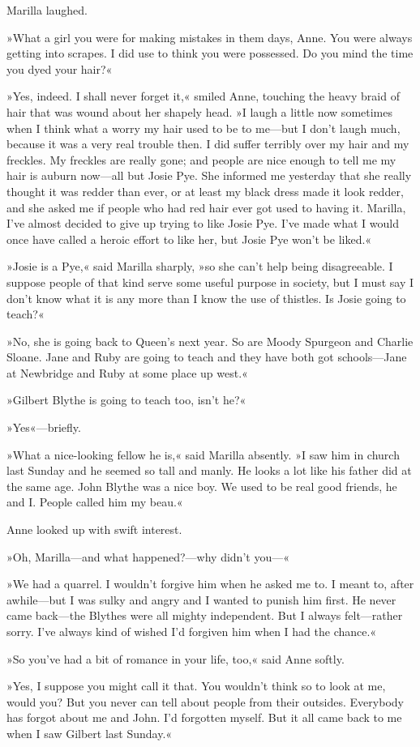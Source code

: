 Marilla laughed.

»What a girl you were for making mistakes in them days, Anne. You were always getting into scrapes. I did use to think you were possessed. Do you mind the time you dyed your hair?«

»Yes, indeed. I shall never forget it,« smiled Anne, touching the heavy braid of hair that was wound about her shapely head. »I laugh a little now sometimes when I think what a worry my hair used to be to me—but I don’t laugh much, because it was a very real trouble then. I did suffer terribly over my hair and my freckles. My freckles are really gone; and people are nice enough to tell me my hair is auburn now—all but Josie Pye. She informed me yesterday that she really thought it was redder than ever, or at least my black dress made it look redder, and she asked me if people who had red hair ever got used to having it. Marilla, I’ve almost decided to give up trying to like Josie Pye. I’ve made what I would once have called a heroic effort to like her, but Josie Pye won’t be liked.«

»Josie is a Pye,« said Marilla sharply, »so she can’t help being disagreeable. I suppose people of that kind serve some useful purpose in society, but I must say I don’t know what it is any more than I know the use of thistles. Is Josie going to teach?«

»No, she is going back to Queen’s next year. So are Moody Spurgeon and Charlie Sloane. Jane and Ruby are going to teach and they have both got schools—Jane at Newbridge and Ruby at some place up west.«

»Gilbert Blythe is going to teach too, isn’t he?«

»Yes«—briefly.

»What a nice-looking fellow he is,« said Marilla absently. »I saw him in church last Sunday and he seemed so tall and manly. He looks a lot like his father did at the same age. John Blythe was a nice boy. We used to be real good friends, he and I. People called him my beau.«

Anne looked up with swift interest.

»Oh, Marilla—and what happened?—why didn’t you—«

»We had a quarrel. I wouldn’t forgive him when he asked me to. I meant to, after awhile—but I was sulky and angry and I wanted to punish him first. He never came back—the Blythes were all mighty independent. But I always felt—rather sorry. I’ve always kind of wished I’d forgiven him when I had the chance.«

»So you’ve had a bit of romance in your life, too,« said Anne softly.

»Yes, I suppose you might call it that. You wouldn’t think so to look at me, would you? But you never can tell about people from their outsides. Everybody has forgot about me and John. I’d forgotten myself. But it all came back to me when I saw Gilbert last Sunday.«